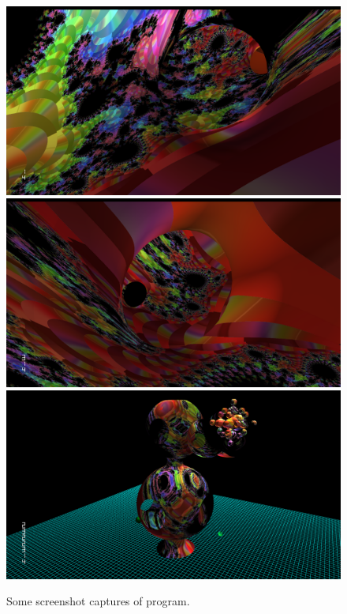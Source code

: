 \documentclass[a4paper]{article}
\begin{document}
\begin{figure}[H]
{}
\subfigure
{
    \label{fig:subfig1}
    \includegraphics[scale=0.1]{o4.PNG}
}
\subfigure
{
    \label{fig:subfig1}
    \includegraphics[scale=0.1]{o5.PNG}
}
\subfigure
{
    \label{fig:subfig1}
    \includegraphics[scale=0.1]{o6.PNG}
}
\caption[1]{Some screenshot captures of program.}
\end{figure}
\end{document}
